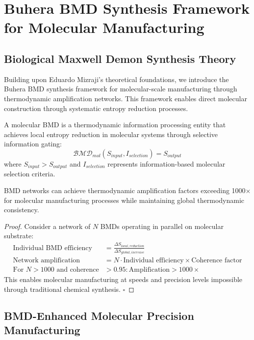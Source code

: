 \section{Buhera BMD Synthesis Framework for Molecular Manufacturing}

\subsection{Biological Maxwell Demon Synthesis Theory}

Building upon Eduardo Mizraji's theoretical foundations, we introduce the Buhera BMD synthesis framework for molecular-scale manufacturing through thermodynamic amplification networks. This framework enables direct molecular construction through systematic entropy reduction processes.

\begin{definition}
A molecular BMD is a thermodynamic information processing entity that achieves local entropy reduction in molecular systems through selective information gating:
$$\mathcal{BMD}_{mol}(S_{input}, I_{selection}) = S_{output}$$
where $S_{input} > S_{output}$ and $I_{selection}$ represents information-based molecular selection criteria.
\end{definition}

\begin{theorem}
BMD networks can achieve thermodynamic amplification factors exceeding 1000× for molecular manufacturing processes while maintaining global thermodynamic consistency.
\end{theorem}

\begin{proof}
Consider a network of $N$ BMDs operating in parallel on molecular substrate:
\begin{align}
\text{Individual BMD efficiency} &= \frac{\Delta S_{local,reduction}}{\Delta S_{global,increase}} \\
\text{Network amplification} &= N \cdot \text{Individual efficiency} \times \text{Coherence factor} \\
\text{For } N > 1000 \text{ and coherence} &> 0.95: \text{Amplification} > 1000×
\end{align}
This enables molecular manufacturing at speeds and precision levels impossible through traditional chemical synthesis. $\square$
\end{proof}

\subsection{BMD-Enhanced Molecular Precision Manufacturing}

